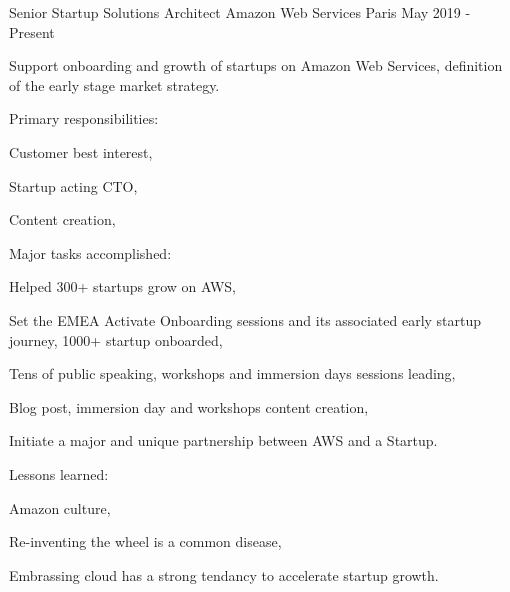 

\begin{cventries}

  \cventry
    {Senior Startup Solutions Architect} %
    {Amazon Web Services} %
    {Paris} %
    {May 2019 - Present} %
    {
      \begin{cvitems} %
        \item {Support onboarding and growth of startups on Amazon Web Services, definition of the early stage market strategy.}
        \item {Primary responsibilities:}
        \begin{cvsubitems}
          \item {Customer best interest,}
          \item {Startup acting CTO,}
          \item {Content creation,}
        \end{cvsubitems}
        \item {Major tasks accomplished:}
        \begin{cvsubitems}
          \item {Helped 300+ startups grow on AWS,}
          \item {Set the EMEA Activate Onboarding sessions and its associated early startup journey, 1000+ startup onboarded,}
          \item {Tens of public speaking, workshops and immersion days sessions leading,}
          \item {Blog post, immersion day and workshops content creation,}
          \item {Initiate a major and unique partnership between AWS and a Startup.}
        \end{cvsubitems}
        \item {Lessons learned:}
        \begin{cvsubitems}
          \item {Amazon culture,}
          \item {Re-inventing the wheel is a common disease,}
          \item {Embrassing cloud has a strong tendancy to accelerate startup growth.}
        \end{cvsubitems}
      \end{cvitems}
    }


\end{cventries}
